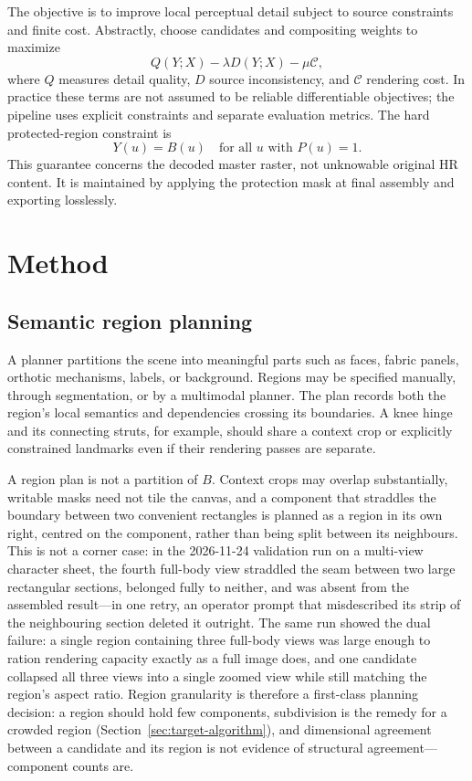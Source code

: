 \documentclass[10pt,twocolumn]{article}
\begin{document}
The objective is to improve local perceptual detail subject to source constraints and finite cost. Abstractly, choose candidates and compositing weights to maximize
\begin{equation}
Q(Y;X)-\lambda D(Y;X)-\mu\mathcal C,
\end{equation}
where $Q$ measures detail quality, $D$ source inconsistency, and $\mathcal C$ rendering cost. In practice these terms are not assumed to be reliable differentiable objectives; the pipeline uses explicit constraints and separate evaluation metrics. The hard protected-region constraint is
\begin{equation}
Y(u)=B(u)\quad\text{for all }u\text{ with }P(u)=1.
\label{eq:invariant}
\end{equation}
This guarantee concerns the decoded master raster, not unknowable original HR content. It is maintained by applying the protection mask at final assembly and exporting losslessly.
\section{Method}
\subsection{Semantic region planning}
A planner partitions the scene into meaningful parts such as faces, fabric panels, orthotic mechanisms, labels, or background. Regions may be specified manually, through segmentation, or by a multimodal planner. The plan records both the region's local semantics and dependencies crossing its boundaries. A knee hinge and its connecting struts, for example, should share a context crop or explicitly constrained landmarks even if their rendering passes are separate.

A region plan is not a partition of $B$. Context crops may overlap substantially, writable masks need not tile the canvas, and a component that straddles the boundary between two convenient rectangles is planned as a region in its own right, centred on the component, rather than being split between its neighbours. This is not a corner case: in the 2026-11-24 validation run on a multi-view character sheet, the fourth full-body view straddled the seam between two large rectangular sections, belonged fully to neither, and was absent from the assembled result---in one retry, an operator prompt that misdescribed its strip of the neighbouring section deleted it outright. The same run showed the dual failure: a single region containing three full-body views was large enough to ration rendering capacity exactly as a full image does, and one candidate collapsed all three views into a single zoomed view while still matching the region's aspect ratio. Region granularity is therefore a first-class planning decision: a region should hold few components, subdivision is the remedy for a crowded region (Section~\ref{sec:target-algorithm}), and dimensional agreement between a candidate and its region is not evidence of structural agreement---component counts are.
\end{document}
